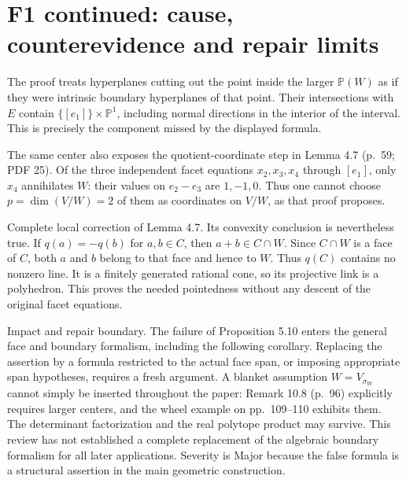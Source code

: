 \documentclass[10pt]{article}
\begin{document}
\section*{F1 continued: cause, counterevidence and repair limits}
The proof treats hyperplanes cutting out the point inside the larger \(\mathbb P(W)\) as if they were intrinsic boundary hyperplanes of that point. Their intersections with \(E\) contain \(\{[e_1]\}\times\mathbb P^1\), including normal directions in the interior of the interval. This is precisely the component missed by the displayed formula.\par
The same center also exposes the quotient-coordinate step in Lemma 4.7 (p. 59; PDF 25). Of the three independent facet equations \(x_2,x_3,x_4\) through \([e_1]\), only \(x_4\) annihilates \(W\): their values on \(e_2-e_3\) are \(1,-1,0\). Thus one cannot choose \(p=\dim(V/W)=2\) of them as coordinates on \(V/W\), as that proof proposes.\par
Complete local correction of Lemma 4.7. Its convexity conclusion is nevertheless true. If \(q(a)=-q(b)\) for \(a,b\in C\), then \(a+b\in C\cap W\). Since \(C\cap W\) is a face of \(C\), both \(a\) and \(b\) belong to that face and hence to \(W\). Thus \(q(C)\) contains no nonzero line. It is a finitely generated rational cone, so its projective link is a polyhedron. This proves the needed pointedness without any descent of the original facet equations.\par
Impact and repair boundary. The failure of Proposition 5.10 enters the general face and boundary formalism, including the following corollary. Replacing the assertion by a formula restricted to the actual face span, or imposing appropriate span hypotheses, requires a fresh argument. A blanket assumption \(W=V_{\sigma_W}\) cannot simply be inserted throughout the paper: Remark 10.8 (p. 96) explicitly requires larger centers, and the wheel example on pp. 109–110 exhibits them. The determinant factorization and the real polytope product may survive. This review has not established a complete replacement of the algebraic boundary formalism for all later applications. Severity is Major because the false formula is a structural assertion in the main geometric construction.\par
\end{document}
